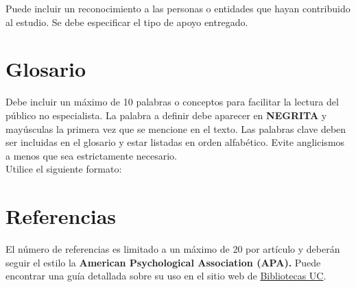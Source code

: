 Puede incluir un reconocimiento a las personas o entidades que hayan
contribuido al estudio. Se debe especificar el tipo de apoyo entregado.

\section{Glosario}\label{glosario}

Debe incluir un máximo de 10 palabras o conceptos para
facilitar la lectura del público no especialista. La palabra a definir
debe aparecer en \textbf{NEGRITA} y mayúsculas la primera vez que se mencione en
el texto. Las palabras clave deben ser incluidas en el glosario y estar
listadas en orden alfabético. Evite anglicismos a menos que sea
estrictamente necesario.\\ Utilice el siguiente formato:


\begin{description}
\end{description}


\section*{Referencias}
El número de referencias es limitado a un máximo de 20 por artículo y
deberán seguir el estilo la \textbf{American Psychological Association
(APA).} Puede encontrar una guía detallada sobre su uso en el sitio web
de
\href{https://guiastematicas.bibliotecas.uc.cl/apa7}{Bibliotecas
UC}.


\newpage